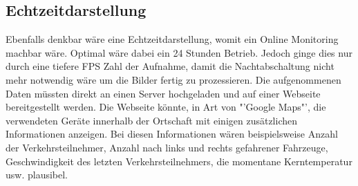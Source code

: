 \subsection{Echtzeitdarstellung}
Ebenfalls denkbar wäre eine Echtzeitdarstellung, womit ein Online Monitoring machbar wäre. Optimal wäre dabei ein 24 Stunden Betrieb. Jedoch ginge dies nur durch eine tiefere FPS Zahl der Aufnahme, damit die Nachtabschaltung nicht mehr notwendig wäre um die Bilder fertig zu prozessieren. Die aufgenommenen Daten müssten direkt an einen Server hochgeladen und auf einer Webseite bereitgestellt werden. Die Webseite könnte, in Art von "'Google Maps"', die verwendeten Geräte innerhalb der Ortschaft mit einigen zusätzlichen Informationen anzeigen. Bei diesen Informationen wären beispielsweise Anzahl der Verkehrsteilnehmer, Anzahl nach links und rechts gefahrener Fahrzeuge, Geschwindigkeit des letzten Verkehrsteilnehmers, die momentane Kerntemperatur usw. plausibel.